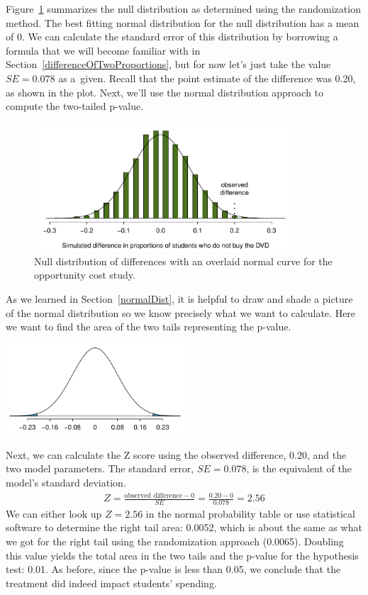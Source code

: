 Figure~\ref{OpportunityCostDiffs_w_normal} summarizes the null distribution as determined using the randomization method. The best fitting normal distribution for the null distribution has a mean of 0. We can calculate the standard error of this distribution by borrowing a formula that we will become familiar with in Section~\ref{differenceOfTwoProportions}, but for now let's just take the value $SE = 0.078$ as a~given. Recall that the point estimate of the difference was 0.20, as shown in the plot. Next, we'll use the normal distribution approach to compute the two-tailed p-value.

\begin{figure}
\centering
\includegraphics[width=0.85\textwidth]{02/figures/OpportunityCost/OpportunityCostDiffs_w_normal}
\caption{Null distribution of differences with an overlaid normal curve for the opportunity cost study.}
\label{OpportunityCostDiffs_w_normal}
\end{figure}

As we learned in Section~\ref{normalDist}, it is helpful to draw and shade a picture of the normal distribution so we know precisely what we want to calculate. Here we want to find the area of the two tails representing the p-value.
\begin{center}
\includegraphics[width=0.5\textwidth]{02/figures/OpportunityCost/OpportunityCostDiffs_normal_only}
\end{center}
Next, we can calculate the Z score using the observed difference, 0.20, and the two model parameters. The standard error, $SE = 0.078$, is the equivalent of the model's standard deviation.
\begin{align*}
Z = \frac{\text{observed difference} - 0}{SE} = \frac{0.20 - 0}{0.078} = 2.56
\end{align*}
We can either look up $Z = 2.56$ in the normal probability table or use statistical software to determine the right tail area: 0.0052, which is about the same as what we got for the right tail using the randomization approach (0.0065). Doubling this value yields the total area in the two tails and the p-value for the hypothesis test: 0.01. As before, since the p-value is less than 0.05, we conclude that the treatment did indeed impact students' spending.

